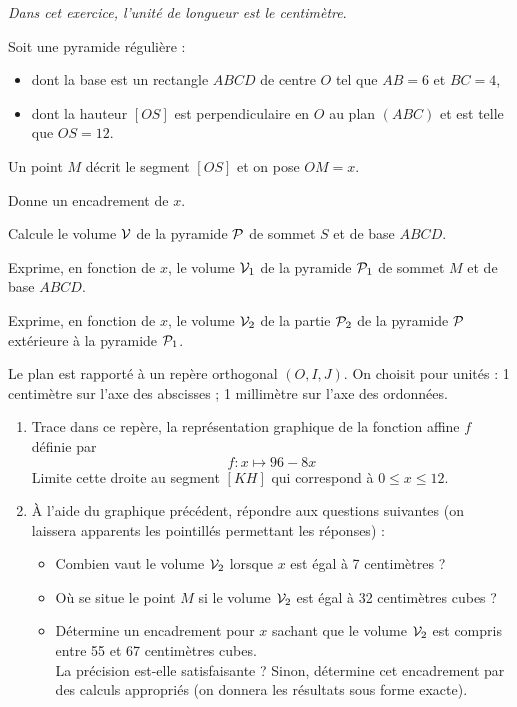 {\em Dans cet exercice, l'unité de longueur est le centimètre}.
\par Soit une pyramide régulière :
\begin{itemize}
\item dont la base est un rectangle $ABCD$ de centre $O$ tel que
$AB=6$ et $BC=4$,
\item dont la hauteur $[OS]$ est perpendiculaire en $O$ au plan
$(ABC)$ et est telle que $OS=12$.
\end{itemize}
\par Un point $M$ décrit le segment $[OS]$ et on pose $OM=x$.
\begin{myenumerate}
\item Donne un encadrement de $x$.
\item Calcule le volume $\cal V$ de la pyramide ${\cal P}$ de sommet
$S$ et de base $ABCD$.
\item Exprime, en fonction de $x$, le volume ${\cal V}_1$ de la
pyramide ${\cal P}_1$ de sommet $M$ et de base $ABCD$.
\item Exprime, en fonction de $x$, le volume ${\cal V}_2$ de la partie
${\cal P}_2$ de la pyramide ${\cal P}$ extérieure à la pyramide ${\cal
P}_1$.
\item Le plan est rapporté à un repère orthogonal $(O,I,J)$. On
choisit pour unités : 1 centimètre sur l'axe des abscisses ; 1
millimètre sur l'axe des ordonnées.
\begin{enumerate}
\item Trace dans ce repère, la représentation graphique de la fonction
affine $f$ définie par \[f:x\mapsto96-8x\] Limite cette droite au
segment $[KH]$ qui correspond à $0\leqslant x\leqslant12$.
\item \`A l'aide du graphique précédent, répondre aux questions
suivantes (on laissera apparents les pointillés permettant les
réponses) :
\begin{itemize}
\item Combien vaut le volume ${\cal V}_2$ lorsque $x$ est égal à 7
centimètres ?
\item Où se situe le point $M$ si le volume ${\cal V}_2$ est égal à 32
centimètres cubes ?
\item Détermine un encadrement pour $x$ sachant que le volume ${\cal
V}_2$ est compris entre 55 et 67 centimètres cubes.
\\La précision est-elle satisfaisante ? Sinon, détermine cet
encadrement par des calculs appropriés (on donnera les résultats sous
forme exacte).
\end{itemize}
\end{enumerate}
\end{myenumerate}